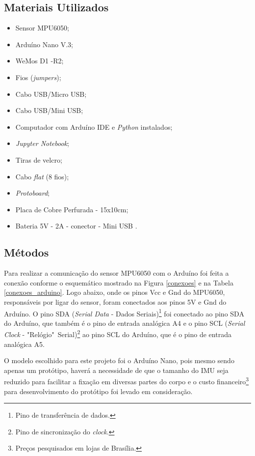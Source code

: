 	\subsection{Materiais Utilizados}
		\begin{itemize}
			
			\item Sensor MPU6050;
			\item Arduíno Nano V.3;
			\item WeMos D1 -R2;
			\item Fios (\textit{jumpers});
			\item Cabo USB/Micro USB;
			\item Cabo USB/Mini USB;
			\item Computador com Arduíno IDE e \textit{Python} instalados;
			\item \textit{Jupyter Notebook};
			\item Tiras de velcro;
			\item Cabo \textit{flat} (8 fios);
			\item \textit{Protoboard};
			\item Placa de Cobre  Perfurada - 15x10cm;
			\item Bateria 5V - 2A -  conector - Mini USB .
		\end{itemize}	
	 
	\subsection{Métodos}
		
		Para realizar a comunicação do sensor MPU6050 com o Arduíno foi feita a conexão conforme o esquemático mostrado na Figura \ref{conexoes} e na Tabela \ref{conexoes_arduino}. Logo abaixo, onde os pinos Vcc e Gnd do MPU6050, responsáveis por ligar do sensor, foram conectados aos pinos 5V e Gnd do Arduíno. O pino SDA (\textit{Serial Data} - Dados Seriais)\footnote{Pino de transferência de dados.} foi conectado ao pino SDA do Arduíno, que também é o pino de entrada analógica A4 e o pino SCL (\textit{Serial Clock} - "Relógio"\ Serial)\footnote{Pino de sincronização do \textit{clock}.} ao pino SCL do Arduíno, que é o pino de entrada analógica A5.  
		
		O  modelo escolhido para este projeto foi o Arduíno Nano, pois mesmo sendo apenas um protótipo, haverá a necessidade de que o tamanho do IMU seja reduzido para facilitar a fixação em diversas partes do corpo e o custo financeiro\footnote{Preços pesquisados em lojas de Brasília.} para desenvolvimento do protótipo foi levado em consideração.
		
